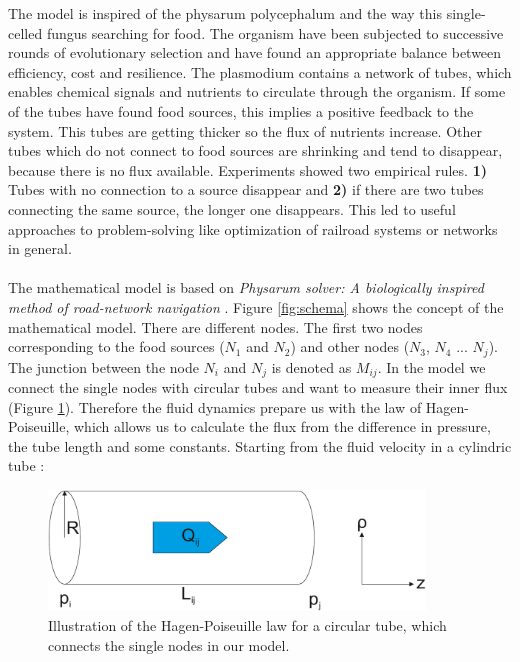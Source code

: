 \documentclass[11pt]{scrartcl}
\begin{document}
The model is inspired of the physarum polycephalum and the way this single-celled fungus searching for food. The organism have been subjected to successive rounds of evolutionary selection and have found an appropriate balance between efficiency, cost and resilience. The plasmodium contains a network of tubes, which enables chemical signals and nutrients to circulate through the organism. If some of the tubes have found food sources, this implies a positive feedback to the system. This tubes are getting thicker so the flux of nutrients increase. Other tubes which do not connect to food sources are shrinking and tend to disappear, because there is no flux available. Experiments showed two empirical rules. \textbf{1)} Tubes with no connection to a source disappear and \textbf{2)} if there are two tubes connecting the same source, the longer one disappears. This led to useful approaches to problem-solving like optimization of railroad systems or networks in general.~\\
~\\
The mathematical model is based on \textit{Physarum solver: A biologically inspired method of road-network navigation} \cite{network_model}. Figure \ref{fig:schema} shows the concept of the mathematical model. There are different nodes. The first two nodes corresponding to the food sources ($N_1$ and $N_2$) and other nodes ($N_3$, $N_4$ ... $N_j$). The junction between the node $N_i$ and $N_j$ is denoted as $M_{ij}$. In the model we connect the single nodes with circular tubes and want to measure their inner flux (Figure \ref{fig:fluidd}). Therefore the fluid dynamics prepare us with the law of Hagen-Poiseuille, which allows us to calculate the flux from the difference in pressure, the tube length and some constants. Starting from the fluid velocity in a cylindric tube \cite{kirb2010}:
\begin{figure}[H]
	\centering
	\includegraphics[width=10cm]{figures/figure2}
	\caption{Illustration of the Hagen-Poiseuille law for a circular tube, which connects the single nodes in our model.}
	\label{fig:fluidd}
\end{figure}
\end{document}
